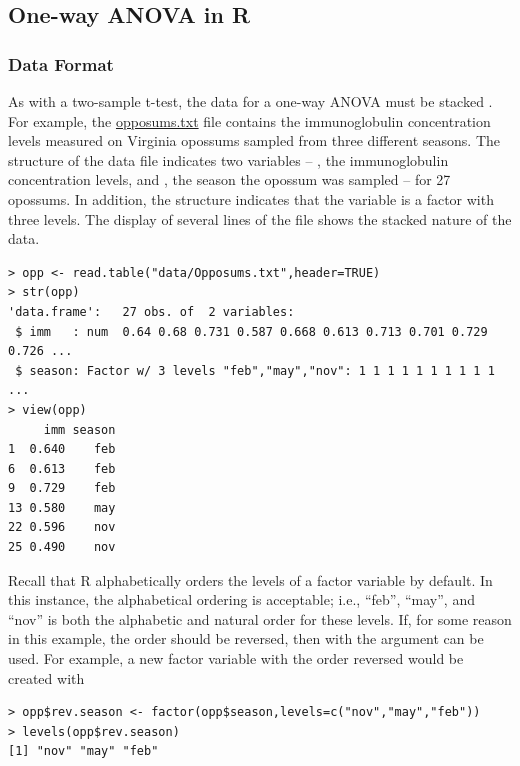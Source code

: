 \documentclass[10pt,openany]{book}\usepackage[]{graphicx}\usepackage[]{color}
\makeatletter
\newenvironment{kframe}{%
 \def\at@end@of@kframe{}%
 \ifinner\ifhmode%
  \def\at@end@of@kframe{\end{minipage}}%
  \begin{minipage}{\columnwidth}%
 \fi\fi%
 \def\FrameCommand##1{\hskip\@totalleftmargin \hskip-\fboxsep
 \colorbox{shadecolor}{##1}\hskip-\fboxsep
     \hskip-\linewidth \hskip-\@totalleftmargin \hskip\columnwidth}%
 \MakeFramed {\advance\hsize-\width
   \@totalleftmargin\z@ \linewidth\hsize
   \@setminipage}}%
 {\par\unskip\endMakeFramed%
 \at@end@of@kframe}
\newenvironment{knitrout}{}{} %
\makeatother
\begin{document}
\subsection{One-way ANOVA in R}
\subsubsection*{Data Format}
As with a two-sample t-test, the data for a one-way ANOVA must be stacked .  For example, the \href{https://sites.google.com/site/ncstats/data/Opposums.txt}{opposums.txt} file contains the immunoglobulin concentration levels measured on Virginia opossums sampled from three different seasons.  The structure of the data file indicates two variables -- , the immunoglobulin concentration levels, and , the season the opossum was sampled -- for 27 opossums.  In addition, the  structure indicates that the  variable is a factor with three levels.  The display of several lines of the file shows the stacked nature of the data.

\begin{knitrout}
\color{fgcolor}\begin{kframe}
\begin{verbatim}
> opp <- read.table("data/Opposums.txt",header=TRUE)
> str(opp)
'data.frame':	27 obs. of  2 variables:
 $ imm   : num  0.64 0.68 0.731 0.587 0.668 0.613 0.713 0.701 0.729 0.726 ...
 $ season: Factor w/ 3 levels "feb","may","nov": 1 1 1 1 1 1 1 1 1 1 ...
> view(opp)
     imm season
1  0.640    feb
6  0.613    feb
9  0.729    feb
13 0.580    may
22 0.596    nov
25 0.490    nov
\end{verbatim}
\end{kframe}
\end{knitrout}

Recall that R alphabetically orders the levels of a factor variable by default.  In this instance, the alphabetical ordering is acceptable; i.e., ``feb'', ``may'', and ``nov'' is both the alphabetic and natural order for these levels.  If, for some reason in this example, the order should be reversed, then  with the  argument can be used.  For example, a new factor variable with the order reversed would be created with

\begin{knitrout}
\color{fgcolor}\begin{kframe}
\begin{verbatim}
> opp$rev.season <- factor(opp$season,levels=c("nov","may","feb"))
> levels(opp$rev.season)
[1] "nov" "may" "feb"
\end{verbatim}
\end{kframe}
\end{knitrout}
\end{document}
